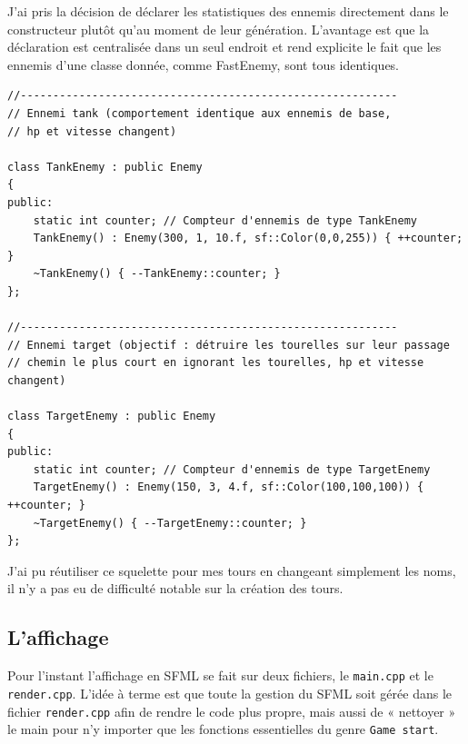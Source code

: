 J’ai pris la décision de déclarer les statistiques des ennemis directement dans le constructeur plutôt qu’au moment de leur génération. L’avantage est que la déclaration est centralisée dans un seul endroit et rend explicite le fait que les ennemis d’une classe donnée, comme FastEnemy, sont tous identiques.

\newpage

\begin{lstlisting}
//----------------------------------------------------------
// Ennemi tank (comportement identique aux ennemis de base,
// hp et vitesse changent)

class TankEnemy : public Enemy
{
public:
    static int counter; // Compteur d'ennemis de type TankEnemy
    TankEnemy() : Enemy(300, 1, 10.f, sf::Color(0,0,255)) { ++counter; }
    ~TankEnemy() { --TankEnemy::counter; } 
};

//----------------------------------------------------------
// Ennemi target (objectif : détruire les tourelles sur leur passage
// chemin le plus court en ignorant les tourelles, hp et vitesse changent)

class TargetEnemy : public Enemy
{
public:
    static int counter; // Compteur d'ennemis de type TargetEnemy
    TargetEnemy() : Enemy(150, 3, 4.f, sf::Color(100,100,100)) { ++counter; }
    ~TargetEnemy() { --TargetEnemy::counter; }
};
\end{lstlisting}

J’ai pu réutiliser ce squelette pour mes tours en changeant simplement les noms, il n’y a pas eu de difficulté notable sur la création des tours.

\newpage

\subsection{L’affichage}

Pour l’instant l’affichage en SFML se fait sur deux fichiers, le \texttt{main.cpp} et le \texttt{render.cpp}. L’idée à terme est que toute la gestion du SFML soit gérée dans le fichier \texttt{render.cpp} afin de rendre le code plus propre, mais aussi de « nettoyer » le main pour n’y importer que les fonctions essentielles du genre \texttt{Game start}.  

